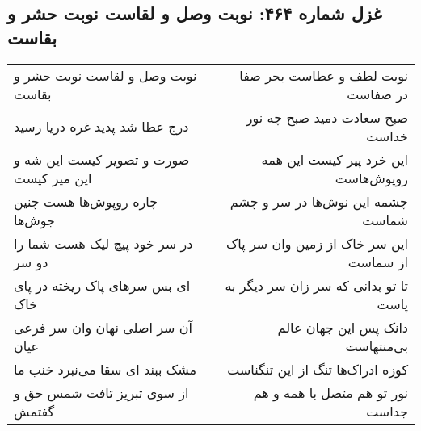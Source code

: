 \begin{center}
\section*{غزل شماره ۴۶۴: نوبت وصل و لقاست نوبت حشر و بقاست}
\label{sec:0464}
\begin{longtable}{l p{0.5cm} r}
نوبت وصل و لقاست نوبت حشر و بقاست
&&
نوبت لطف و عطاست بحر صفا در صفاست
\\
درج عطا شد پدید غره دریا رسید
&&
صبح سعادت دمید صبح چه نور خداست
\\
صورت و تصویر کیست این شه و این میر کیست
&&
این خرد پیر کیست این همه روپوش‌هاست
\\
چاره روپوش‌ها هست چنین جوش‌ها
&&
چشمه این نوش‌ها در سر و چشم شماست
\\
در سر خود پیچ لیک هست شما را دو سر
&&
این سر خاک از زمین وان سر پاک از سماست
\\
ای بس سرهای پاک ریخته در پای خاک
&&
تا تو بدانی که سر زان سر دیگر به پاست
\\
آن سر اصلی نهان وان سر فرعی عیان
&&
دانک پس این جهان عالم بی‌منتهاست
\\
مشک ببند ای سقا می‌نبرد خنب ما
&&
کوزه ادراک‌ها تنگ از این تنگناست
\\
از سوی تبریز تافت شمس حق و گفتمش
&&
نور تو هم متصل با همه و هم جداست
\\
\end{longtable}
\end{center}
